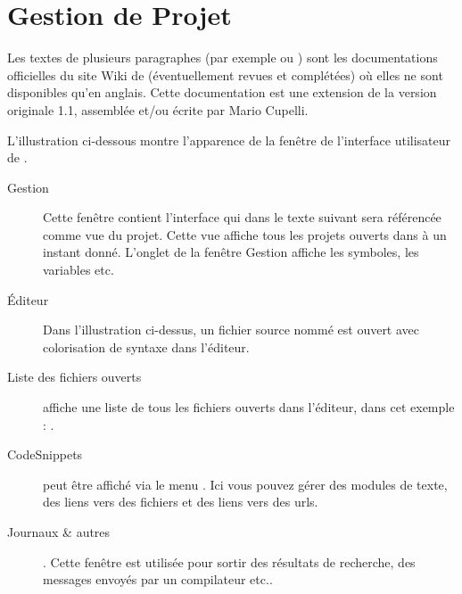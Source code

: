 \chapter{Gestion de Projet \codeblocks}

Les textes de plusieurs paragraphes (par exemple  ou ) sont les documentations officielles du site Wiki de \codeblocks (éventuellement revues et complétées) où elles ne sont disponibles qu'en anglais.
Cette documentation est une extension de la version originale 1.1, assemblée et/ou écrite par Mario Cupelli.


L'illustration ci-dessous montre l'apparence de la fenêtre de l'interface utilisateur de \codeblocks.


\begin{description}
\item[Gestion] Cette fenêtre contient l'interface  qui dans le texte suivant sera référencée comme vue du projet. Cette vue affiche tous les projets ouverts dans \codeblocks à un instant donné. L'onglet  de la fenêtre Gestion affiche les symboles, les variables etc.
\item[Éditeur] Dans l'illustration ci-dessus, un fichier source nommé  est ouvert avec colorisation de syntaxe dans l'éditeur.
\item[Liste des fichiers ouverts] affiche une liste de tous les fichiers ouverts dans l'éditeur, dans cet exemple : .
\item[CodeSnippets] peut être affiché via le menu . Ici vous pouvez gérer des modules de texte, des liens vers des fichiers et des liens vers des urls.
\item[Journaux \& autres]. Cette fenêtre est utilisée pour sortir des résultats de recherche, des messages envoyés par un compilateur etc..
\end{description}

